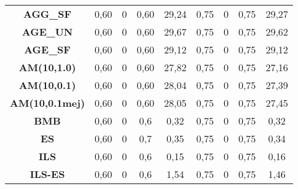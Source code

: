 \begin{table}[H]
{\begin{tabular}{ccccccccc}
\multicolumn{1}{|c|}{\textbf{AGG\_SF}} & 0,60 & 0 & 0,60 & \multicolumn{1}{c|}{29,24} & 0,75 & 0 & 0,75 & \multicolumn{1}{c|}{29,27} \\
\multicolumn{1}{|c|}{\textbf{AGE\_UN}} & 0,60 & 0 & 0,60 & \multicolumn{1}{c|}{29,67} & 0,75 & 0 & 0,75 & \multicolumn{1}{c|}{29,62} \\
\multicolumn{1}{|c|}{\textbf{AGE\_SF}} & 0,60 & 0 & 0,60 & \multicolumn{1}{c|}{29,12} & 0,75 & 0 & 0,75 & \multicolumn{1}{c|}{29,12} \\
\multicolumn{1}{|c|}{\textbf{AM(10,1.0)}} & 0,60 & 0 & 0,60 & \multicolumn{1}{c|}{27,82} & 0,75 & 0 & 0,75 & \multicolumn{1}{c|}{27,16} \\
\multicolumn{1}{|c|}{\textbf{AM(10,0.1)}} & 0,60 & 0 & 0,60 & \multicolumn{1}{c|}{28,04} & 0,75 & 0 & 0,75 & \multicolumn{1}{c|}{27,39} \\
\multicolumn{1}{|c|}{\textbf{AM(10,0.1mej)}} & 0,60 & 0 & 0,60 & \multicolumn{1}{c|}{28,05} & 0,75 & 0 & 0,75 & \multicolumn{1}{c|}{27,45} \\
\multicolumn{1}{|c|}{\textbf{BMB}} & 0,60 & 0 & 0,6 & \multicolumn{1}{c|}{0,32} & 0,75 & 0 & 0,75 & \multicolumn{1}{c|}{0,32} \\
\multicolumn{1}{|c|}{\textbf{ES}} & 0,60 & 0 & 0,7 & \multicolumn{1}{c|}{0,35} & 0,75 & 0 & 0,75 & \multicolumn{1}{c|}{0,34} \\
\multicolumn{1}{|c|}{\textbf{ILS}} & 0,60 & 0 & 0,6 & \multicolumn{1}{c|}{0,15} & 0,75 & 0 & 0,75 & \multicolumn{1}{c|}{0,16} \\
\multicolumn{1}{|c|}{\textbf{ILS-ES}} & 0,60 & 0 & 0,6 & \multicolumn{1}{c|}{1,54} & 0,75 & 0 & 0,75 & \multicolumn{1}{c|}{1,46} \\ \hline
\end{tabular}%
}
\end{table}

